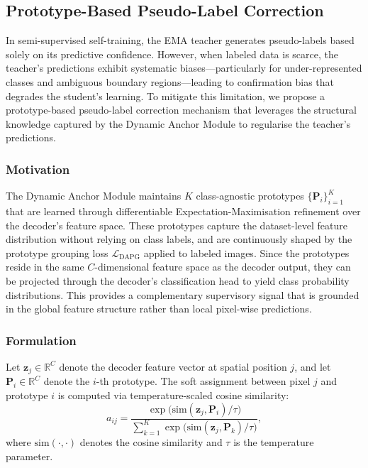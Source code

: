 \subsection{Prototype-Based Pseudo-Label Correction}
\label{sec:pseudo_label_correction}

In semi-supervised self-training, the EMA teacher generates pseudo-labels based solely on its predictive confidence. However, when labeled data is scarce, the teacher's predictions exhibit systematic biases---particularly for under-represented classes and ambiguous boundary regions---leading to confirmation bias that degrades the student's learning. To mitigate this limitation, we propose a prototype-based pseudo-label correction mechanism that leverages the structural knowledge captured by the Dynamic Anchor Module to regularise the teacher's predictions.

\subsubsection{Motivation}

The Dynamic Anchor Module maintains $K$ class-agnostic prototypes $\{\mathbf{P}_i\}_{i=1}^{K}$ that are learned through differentiable Expectation-Maximisation refinement over the decoder's feature space. These prototypes capture the dataset-level feature distribution without relying on class labels, and are continuously shaped by the prototype grouping loss $\mathcal{L}_{\text{DAPG}}$ applied to labeled images. Since the prototypes reside in the same $C$-dimensional feature space as the decoder output, they can be projected through the decoder's classification head to yield class probability distributions. This provides a complementary supervisory signal that is grounded in the global feature structure rather than local pixel-wise predictions.

\subsubsection{Formulation}

Let $\mathbf{z}_j \in \mathbb{R}^C$ denote the decoder feature vector at spatial position $j$, and let $\mathbf{P}_i \in \mathbb{R}^C$ denote the $i$-th prototype. The soft assignment between pixel $j$ and prototype $i$ is computed via temperature-scaled cosine similarity:
\begin{equation}
    a_{ij} = \frac{\exp\bigl(\text{sim}(\mathbf{z}_j, \mathbf{P}_i) / \tau\bigr)}{\sum_{k=1}^{K} \exp\bigl(\text{sim}(\mathbf{z}_j, \mathbf{P}_k) / \tau\bigr)},
    \label{eq:soft_assignment}
\end{equation}
where $\text{sim}(\cdot, \cdot)$ denotes the cosine similarity and $\tau$ is the temperature parameter.

